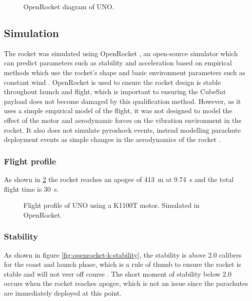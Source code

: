 \documentclass[a4paper,11pt]{article}
\begin{document}
\begin{figure}[H]
  
  \label{fig:openrocket}
  \caption{OpenRocket diagram of UNO.}
\end{figure}

\subsection{Simulation}

The rocket was simulated using OpenRocket \cite{openrocket,niskanen2009}, an open-source simulator which can predict parameters such as stability and acceleration based on empirical methods which use the rocket's shape and basic environment parameters such as constant wind \cite{doi:10.1177/0954410017752730,niskanen2009}. OpenRocket is used to ensure the rocket design is stable throughout launch and flight, which is important to ensuring the CubeSat payload does not become damaged by this qualification method. However, as it uses a simple empirical model of the flight, it was not designed to model the effect of the motor and aerodynamic forces on the vibration environment in the rocket. It also does not simulate pyroshock events, instead modelling parachute deployment events as simple changes in the aerodynamics of the rocket \cite{niskanen2009}.

\subsubsection{Flight profile}

As shown in \ref{fig:openrocket-k-launch} the rocket reaches an apogee of \SI{413}{\meter} at \SI{9.74}{\second} and the total flight time is \SI{30}{\second}.

\begin{figure}[H]
  
  \label{fig:openrocket-k-launch}
  \caption{Flight profile of UNO using a K1100T motor. Simulated in OpenRocket.}
\end{figure}


\subsubsection{Stability}

As shown in figure \ref{fig:openrocket-k-stability}, the stability is above 2.0 calibres for the coast and launch phase, which is a rule of thumb to ensure the rocket is stable and will not veer off course \cite{canepa2005modern}. The short moment of stability below 2.0 occurs when the rocket reaches apogee, which is not an issue since the parachutes are immediately deployed at this point.
\end{document}
